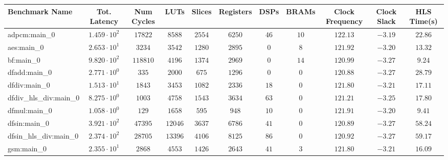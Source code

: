 \begin{tabular}{|l|c|c|c|c|c|c|c|c|c|c|}
\hline
Benchmark Name          & Tot. Latency           & Num Cycles & LUTs      & Slices    & Registers & DSPs    & BRAMs   & Clock Frequency & Clock Slack & HLS Time(s) \\
\hline
adpcm:main\_0           & $ 1.459 \cdot 10^{2} $ & $ 17822  $ & $ 8588  $ & $ 2554  $ & $ 6250  $ & $ 46  $ & $ 10  $ & $ 122.13      $ & $ -3.19   $ & $ 22.86   $ \\
aes:main\_0             & $ 2.653 \cdot 10^{1} $ & $ 3234   $ & $ 3542  $ & $ 1280  $ & $ 2895  $ & $ 0   $ & $ 8   $ & $ 121.92      $ & $ -3.20   $ & $ 13.32   $ \\
bf:main\_0              & $ 9.820 \cdot 10^{2} $ & $ 118810 $ & $ 4196  $ & $ 1374  $ & $ 2969  $ & $ 0   $ & $ 14  $ & $ 120.99      $ & $ -3.27   $ & $ 9.24    $ \\
dfadd:main\_0           & $ 2.771 \cdot 10^{0} $ & $ 335    $ & $ 2000  $ & $ 675   $ & $ 1296  $ & $ 0   $ & $ 0   $ & $ 120.88      $ & $ -3.27   $ & $ 28.79   $ \\
dfdiv:main\_0           & $ 1.513 \cdot 10^{1} $ & $ 1843   $ & $ 3453  $ & $ 1082  $ & $ 2336  $ & $ 18  $ & $ 0   $ & $ 121.80      $ & $ -3.21   $ & $ 17.11   $ \\
dfdiv\_hls\_div:main\_0 & $ 8.275 \cdot 10^{0} $ & $ 1003   $ & $ 4758  $ & $ 1543  $ & $ 3634  $ & $ 63  $ & $ 0   $ & $ 121.21      $ & $ -3.25   $ & $ 17.80   $ \\
dfmul:main\_0           & $ 1.058 \cdot 10^{0} $ & $ 129    $ & $ 1658  $ & $ 595   $ & $ 948   $ & $ 10  $ & $ 0   $ & $ 121.91      $ & $ -3.20   $ & $ 9.41    $ \\
dfsin:main\_0           & $ 3.921 \cdot 10^{2} $ & $ 47395  $ & $ 12046 $ & $ 3637  $ & $ 6786  $ & $ 41  $ & $ 0   $ & $ 120.89      $ & $ -3.27   $ & $ 58.24   $ \\
dfsin\_hls\_div:main\_0 & $ 2.374 \cdot 10^{2} $ & $ 28705  $ & $ 13396 $ & $ 4106  $ & $ 8125  $ & $ 86  $ & $ 0   $ & $ 120.92      $ & $ -3.27   $ & $ 59.17   $ \\
gsm:main\_0             & $ 2.355 \cdot 10^{1} $ & $ 2868   $ & $ 4553  $ & $ 1426  $ & $ 2643  $ & $ 41  $ & $ 3   $ & $ 121.80      $ & $ -3.21   $ & $ 16.09   $ \\

\end{tabular}
